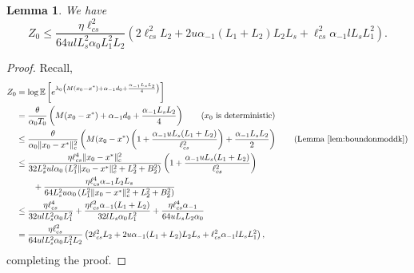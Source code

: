 \documentclass{article}
\newcommand{\lrp}[1]{\left( #1 \right)}
\newcommand{\lrs}[1]{\left[ #1 \right]}
\newcommand{\abs}[1]{\left|{#1}\right|}
\newcommand{\E}[1]{\mathbb{E}\lrs{#1}}
\newcommand{\lcs}{\ell_{cs}}
\newtheorem{lemma}[theorem]{Lemma}
\begin{document}
\begin{lemma}\label{lem:boundonZ0} We have
    \[ Z_0 \le \frac{\eta\lcs^2}{64 ul L^2_s \alpha_0 L^2_1 L_2 }\lrp{2\lcs^2 L_2 +  2 u \alpha_{-1} (L_1 + L_2)  L_2 L_s + \lcs^2 \alpha_{-1} l L_s L^2_1 }. \]
\end{lemma}
\begin{proof}
    Recall, 
\begin{align*}
    Z_0 &= \log \E{ e^{\lambda_0 \lrp{ M(x_0-x^*)  + \alpha_{-1} d_0 + \frac{\alpha_{-1} L_sL_2}{4}} }}\\
    &= \frac{\theta}{\alpha_0 T_0} \lrp{ M(x_0 - x^*)  + \alpha_{-1} d_0 + \frac{\alpha_{-1} L_sL_2}{4}} \tag{$x_0$ is deterministic}\\
    &\le \frac{\theta}{\alpha_0 \|x_0-x^*\|^2_c} \lrp{ M(x_0-x^*)  \lrp{1+\frac{\alpha_{-1} u L_s (L_1+L_2)}{\lcs^2}} + \frac{\alpha_{-1}  L_sL_2}{2}}\tag{Lemma~\ref{lem:boundonmoddk}}\\
    &\le \frac{\eta \lcs^4 \|x_0 - x^*\|^2_c}{32 L^2_s ul  \alpha_0\lrp{L^2_1\|x_0 - x^*\|^2_c + L^2_2 + B^2_2} } \lrp{1+\frac{\alpha_{-1} u L_s (L_1 + L_2)}{\lcs^2}} \\
    &\qquad + \frac{\eta \lcs^4 \alpha_{-1} L_2L_s}{64 L^2_s u \alpha_0 \lrp{L^2_1\|x_0 - x^*\|^2_c + L^2_2 + B^2_2}  }\\
    &\le \frac{\eta \lcs^4 }{32 ul L^2_s \alpha_0 L^2_1  } + \frac{\eta \lcs^2 \alpha_{-1} (L_1 + L_2)}{32 l L_s \alpha_0 L^2_1  } + \frac{\eta \lcs^4 \alpha_{-1} }{64 u L_s L_2  \alpha_0 }\\
    &=  \frac{\eta\lcs^2}{64 ul L^2_s \alpha_0 L^2_1 L_2 }\lrp{2\lcs^2 L_2 +  2 u \alpha_{-1} (L_1 + L_2)  L_2 L_s + \lcs^2 \alpha_{-1} l L_s L^2_1 },
\end{align*}
completing the proof.
\end{proof}
\end{document}

